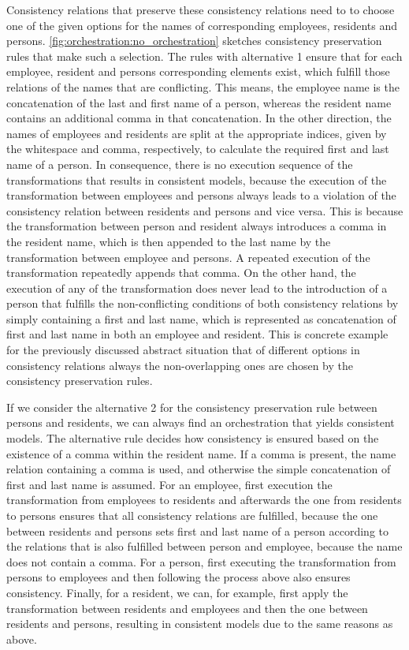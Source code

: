 Consistency relations that preserve these consistency relations need to to choose one of the given options for the names of corresponding employees, residents and persons.
\autoref{fig:orchestration:no_orchestration} sketches consistency preservation rules that make such a selection.
The rules with alternative 1 ensure that for each employee, resident and persons corresponding elements exist, which fulfill those relations of the names that are conflicting.
This means, the employee name is the concatenation of the last and first name of a person, whereas the resident name contains an additional comma in that concatenation.
In the other direction, the names of employees and residents are split at the appropriate indices, given by the whitespace and comma, respectively, to calculate the required first and last name of a person.
In consequence, there is no execution sequence of the transformations that results in consistent models, because the execution of the transformation between employees and persons always leads to a violation of the consistency relation between residents and persons and vice versa.
This is because the transformation between person and resident always introduces a comma in the resident name, which is then appended to the last name by the transformation between employee and persons.
A repeated execution of the transformation repeatedly appends that comma.
On the other hand, the execution of any of the transformation does never lead to the introduction of a person that fulfills the non-conflicting conditions of both consistency relations by simply containing a first and last name, which is represented as concatenation of first and last name in both an employee and resident.
This is concrete example for the previously discussed abstract situation that of different options in consistency relations always the non-overlapping ones are chosen by the consistency preservation rules.

If we consider the alternative 2 for the consistency preservation rule between persons and residents, we can always find an orchestration that yields consistent models.
The alternative rule decides how consistency is ensured based on the existence of a comma within the resident name.
If a comma is present, the name relation containing a comma is used, and otherwise the simple concatenation of first and last name is assumed.
For an employee, first execution the transformation from employees to residents and afterwards the one from residents to persons ensures that all consistency relations are fulfilled, because the one between residents and persons sets first and last name of a person according to the relations that is also fulfilled between person and employee, because the name does not contain a comma.
For a person, first executing the transformation from persons to employees and then following the process above also ensures consistency.
Finally, for a resident, we can, for example, first apply the transformation between residents and employees and then the one between residents and persons, resulting in consistent models due to the same reasons as above.

